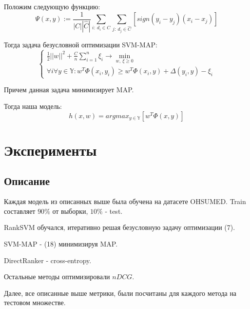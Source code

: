 \documentclass{article}[16pt]
\begin{document}
	Положим следующую функцию:
	\begin{equation}
		\Psi(x, y) := \frac1{|C||\hat{C}|} \sum_{i:~d_i \in C} \sum_{j: ~d_j \in \hat{C}} [
			sign (y_i - y_j) (x_{i}- x_j)
		]
	\end{equation}
	
	Тогда задача безусловной оптимизации SVM-MAP:
	\begin{equation}
		\begin{cases}	
			\frac12 ||w||^2 + \frac{C}{n}\sum_{i=1}^n \xi_i \rightarrow \min_{w, ~\xi \ge 0} \\
			\forall i \forall y \in \mathbb{Y}:
			w^T\Phi(x_i, y_i) \ge w^T\Phi(x_i, y) + \Delta(y_i, y) - \xi_i
		\end{cases}
	\end{equation}
	
	Причем данная задача минимизирует MAP. 
	
	Тогда наша модель:
	\begin{equation}
		h(x, w) = argmax_{y \in \mathbb{Y}} [w^T\Phi(x, y)]
	\end{equation}

	\section{Эксперименты}
	\subsection{Описание}
	Каждая модель из описанных выше была обучена на датасете OHSUMED. Train составляет $90\%$ от выборки, $10\%$ - test.
	
	RankSVM обучался, итеративно решая безусловную задачу оптимизации (7). 
	
	SVM-MAP - (18) минимизируя MAP.
	
	DirectRanker - cross-entropy.
	
	Остальные методы оптимизировали $nDCG$.
	
	Далее, все описанные выше метрики, были посчитаны для каждого метода на тестовом множестве.
	
\end{document}

